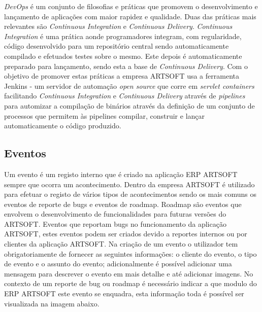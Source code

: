 \documentclass[sigplan]{acmart}
\begin{document}
\textit{DevOps} é um conjunto de filosofias e práticas que promovem o desenvolvimento e lançamento de aplicações com maior rapidez e qualidade. Duas das práticas mais relevantes são \textit{Continuous Integration} e \textit{Continuous Delivery}. \textit{Continuous Integration} é uma prática aonde programadores integram, com regularidade, código desenvolvido para um repositório central sendo automaticamente compilado e efetuados testes sobre o mesmo. Este depois é automaticamente preparado para lançamento, sendo esta a base de \textit{Continuous Delivery}. Com o objetivo de promover estas práticas a empresa ARTSOFT usa a ferramenta Jenkins - um servidor de automação \textit{open source} que corre em \textit{servlet containers} facilitando \textit{Continuous Integration} e \textit{Continuous Delivery} através de \textit{pipelines} para automizar a compilação de binários através da definição de um conjunto de processos que permitem às pipelines compilar, construir e lançar automaticamente o código produzido.


\subsection{Eventos}

Um evento é um registo interno que é criado na aplicação ERP ARTSOFT sempre que ocorra um acontecimento. Dentro da empresa ARTSOFT é utilizado para efetuar o registo de vários tipos de acontecimentos sendo os mais comuns os eventos de reporte de bugs e eventos de roadmap. Roadmap são eventos que envolvem o desenvolvimento de funcionalidades para futuras versões do ARTSOFT. Eventos que reportam bugs no funcionamento da aplicação ARTSOFT, estes eventos podem ser criados devido a reportes internos ou por clientes da aplicação ARTSOFT. Na criação de um evento o utilizador tem obrigatoriamente de fornecer as seguintes informações: o cliente do evento, o tipo de evento e o assunto do evento; adicionalmente é possível adicionar uma mensagem para descrever o evento em mais detalhe e até adicionar imagens. No contexto de um reporte de bug ou roadmap é necessário indicar a que modulo do ERP ARTSOFT este evento se enquadra, esta informação toda é possível ser visualizada na imagem abaixo.
\end{document}
